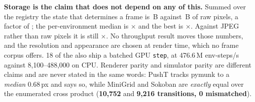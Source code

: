 \documentclass{article}
\begin{document}
\textbf{Storage is the claim that does not depend on any of this.} Summed over
the registry the state that determines a frame is \seStorageStateB\,B against
\seStorageRawB\,B of raw pixels, a factor of \textbf{\seStorageRatio}; the
per-environment median is \seStorageMedian$\times$ and the best is
\seStorageMax$\times$. Against JPEG rather than raw pixels it is still
\seJpegRatio$\times$. No throughput result moves those numbers, and the
resolution and appearance are chosen at render time, which no frame corpus
offers. 18 of the \seNenvs{} also ship a batched GPU \texttt{step}, at 476.6\,M
env-steps/s against 8,100--488,000 on CPU. Renderer parity and simulator parity
are different claims and are never stated in the same words: PushT tracks
pymunk to a \emph{median} 0.68\,px and says so, while MiniGrid and Sokoban are
\emph{exactly} equal over the enumerated cross product (\textbf{10,752} and
\textbf{9,216 transitions, 0 mismatched}).
\end{document}
